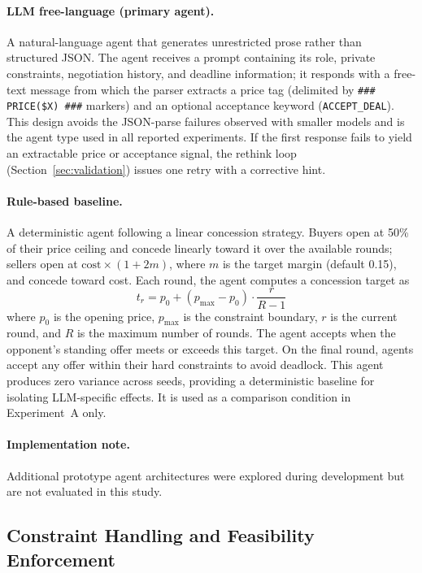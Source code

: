 \paragraph{LLM free-language (primary agent).}
A natural-language agent that generates unrestricted prose rather than structured JSON.  The agent receives a prompt containing its role, private constraints, negotiation history, and deadline information; it responds with a free-text message from which the parser extracts a price tag (delimited by \texttt{\#\#\# PRICE(\$X) \#\#\#} markers) and an optional acceptance keyword (\texttt{ACCEPT\_DEAL}).  This design avoids the JSON-parse failures observed with smaller models and is the agent type used in all reported experiments.  If the first response fails to yield an extractable price or acceptance signal, the rethink loop (Section~\ref{sec:validation}) issues one retry with a corrective hint.

\paragraph{Rule-based baseline.}
A deterministic agent following a linear concession strategy.  Buyers open at 50\% of their price ceiling and concede linearly toward it over the available rounds; sellers open at $\text{cost} \times (1 + 2m)$, where $m$ is the target margin (default 0.15), and concede toward cost.  Each round, the agent computes a concession target as
\[
    t_r = p_0 + (p_{\max} - p_0) \cdot \frac{r}{R - 1}
\]
where $p_0$ is the opening price, $p_{\max}$ is the constraint boundary, $r$ is the current round, and $R$ is the maximum number of rounds.  The agent accepts when the opponent's standing offer meets or exceeds this target.  On the final round, agents accept any offer within their hard constraints to avoid deadlock.  This agent produces zero variance across seeds, providing a deterministic baseline for isolating LLM-specific effects.  It is used as a comparison condition in Experiment~A only.

\paragraph{Implementation note.}
Additional prototype agent architectures were explored during development but are not evaluated in this study.

\subsection{Constraint Handling and Feasibility Enforcement}
\label{sec:enforcement}


